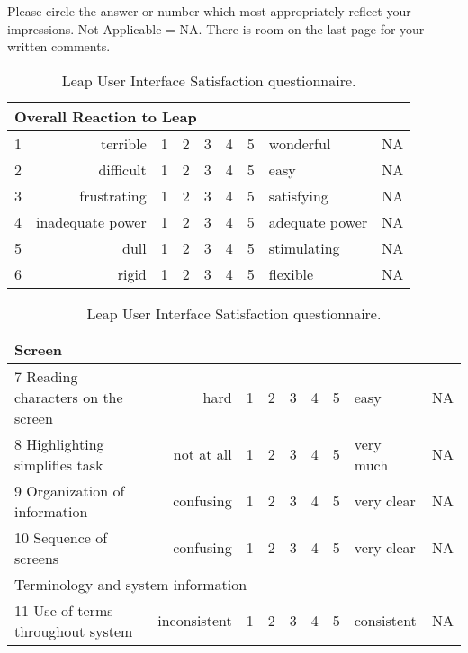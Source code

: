 
\label{sec:satisfaction-questionnaire}
Please circle the answer or number which most appropriately reflect your
impressions.  Not Applicable = NA.   There is room on the last page for your
written comments.\\
\begin{table}[htbp]
  \caption{Leap User Interface Satisfaction questionnaire.}  
  \begin{tabular}{lrccccclc}\\
    \hline
    \multicolumn{9}{l}{Overall Reaction to Leap} \\ \hline
    1&terrible&1&2&3&4&5&wonderful&NA\\ \hline
    2&difficult&1&2&3&4&5&easy&NA\\ \hline
    3&frustrating&1&2&3&4&5&satisfying&NA\\ \hline
    4&inadequate power&1&2&3&4&5&adequate power&NA\\ \hline
    5&dull&1&2&3&4&5&stimulating&NA\\ \hline
    6&rigid&1&2&3&4&5&flexible&NA\\ \hline
  \end{tabular}
  \begin{tabular}{lrccccclc}\\
    \hline
    \multicolumn{9}{l}{Screen} \\ \hline
    7 Reading characters on the screen&hard&1&2&3&4&5&easy&NA\\ \hline
    8 Highlighting simplifies task&not at all&1&2&3&4&5&very much&NA\\ \hline
    9 Organization of information&confusing&1&2&3&4&5&very clear&NA\\ \hline
    10 Sequence of screens&confusing&1&2&3&4&5&very clear&NA\\ \hline
    \hline
    \multicolumn{9}{l}{Terminology and system information} \\ \hline
    11 Use of terms throughout system&inconsistent&1&2&3&4&5&consistent&NA\\ \hline

\end{tabular}
\end{table}

